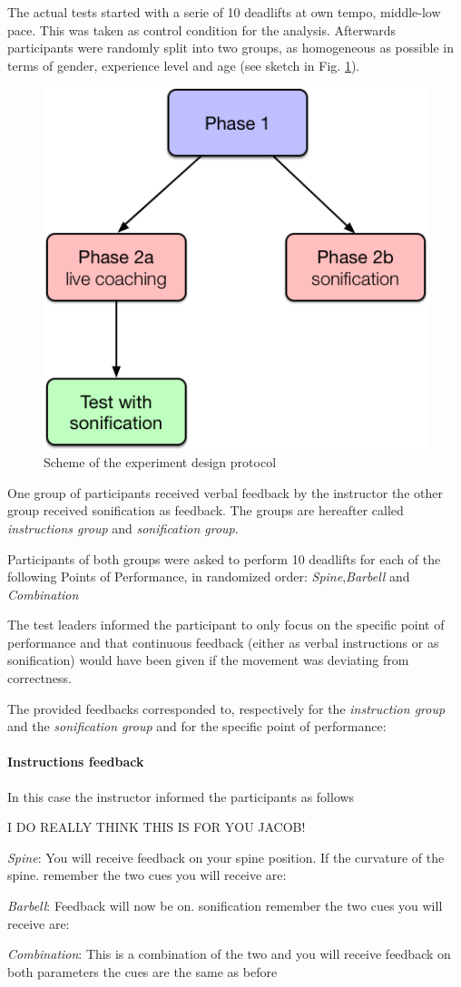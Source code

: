 \documentclass[10pt,letterpaper]{article}
\begin{document}
The actual tests started with a serie of 10 deadlifts at own tempo, middle-low pace. This was taken as control condition for the analysis. Afterwards participants were randomly split into two groups, as homogeneous as possible in terms of gender, experience level and age (see sketch in Fig. \ref{fig:exp-flow}).
\begin{figure}[!h]
\center
\includegraphics[width=.5\textwidth]{figures/Experiment-flow.png}
\caption{Scheme of the experiment design protocol}
\label{fig:exp-flow}      
\end{figure}




One group of participants received verbal feedback by the instructor the other group received sonification as feedback. The groups are hereafter called \emph{instructions group} and \emph{sonification group}.



Participants of both groups were asked to perform 10 deadlifts for each of the following Points of Performance, in randomized order:
\emph{Spine},\emph{Barbell} and \emph{Combination}

The test leaders informed the participant to only focus on the specific point of performance and that continuous feedback (either as verbal instructions or as sonification) would have been given if the movement was deviating from correctness.

The provided feedbacks corresponded to, respectively for the \emph{instruction group} and the \emph{sonification group} and for the specific point of performance:
\paragraph{Instructions feedback} 
In this case the instructor informed the participants as follows


I DO REALLY THINK THIS IS FOR YOU JACOB!
\begin{description}
\item  \emph{Spine}: You will receive feedback on your spine position. If the curvature of the spine.    remember the two cues you will receive are: 
\item  \emph{Barbell}: Feedback will now be on.   sonification  remember the two cues you will receive are: 
\item  \emph{Combination}: This is a combination of the two and you will receive feedback on both parameters the cues are the same as before 
\end{description}
\end{document}
